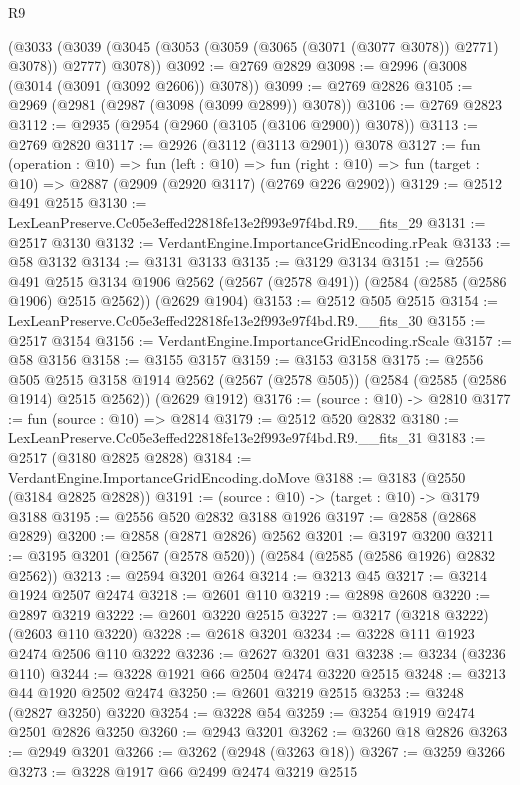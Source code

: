 \begin{lexlean}{R9}
\begin{coremodule}
    (@3033 (@3039 (@3045 (@3053 (@3059 (@3065 (@3071 (@3077 @3078)) @2771) @3078)) @2777) @3078))
@3092 := @2769 @2829
@3098 := @2996 (@3008 (@3014 (@3091 (@3092 @2606)) @3078))
@3099 := @2769 @2826
@3105 := @2969 (@2981 (@2987 (@3098 (@3099 @2899)) @3078))
@3106 := @2769 @2823
@3112 := @2935 (@2954 (@2960 (@3105 (@3106 @2900)) @3078))
@3113 := @2769 @2820
@3117 := @2926 (@3112 (@3113 @2901)) @3078
@3127 := fun (operation : @10) =>
  fun (left : @10) =>
  fun (right : @10) => fun (target : @10) => @2887 (@2909 (@2920 @3117) (@2769 @226 @2902))
@3129 := @2512 @491 @2515
@3130 := LexLeanPreserve.Cc05e3effed22818fe13e2f993e97f4bd.R9.__fits_29
@3131 := @2517 @3130
@3132 := VerdantEngine.ImportanceGridEncoding.rPeak
@3133 := @58 @3132
@3134 := @3131 @3133
@3135 := @3129 @3134
@3151 := @2556
    @491
    @2515
    @3134
    @1906
    @2562
    (@2567 (@2578 @491))
    (@2584 (@2585 (@2586 @1906) @2515 @2562))
    (@2629 @1904)
@3153 := @2512 @505 @2515
@3154 := LexLeanPreserve.Cc05e3effed22818fe13e2f993e97f4bd.R9.__fits_30
@3155 := @2517 @3154
@3156 := VerdantEngine.ImportanceGridEncoding.rScale
@3157 := @58 @3156
@3158 := @3155 @3157
@3159 := @3153 @3158
@3175 := @2556
    @505
    @2515
    @3158
    @1914
    @2562
    (@2567 (@2578 @505))
    (@2584 (@2585 (@2586 @1914) @2515 @2562))
    (@2629 @1912)
@3176 := (source : @10) -> @2810
@3177 := fun (source : @10) => @2814
@3179 := @2512 @520 @2832
@3180 := LexLeanPreserve.Cc05e3effed22818fe13e2f993e97f4bd.R9.__fits_31
@3183 := @2517 (@3180 @2825 @2828)
@3184 := VerdantEngine.ImportanceGridEncoding.doMove
@3188 := @3183 (@2550 (@3184 @2825 @2828))
@3191 := (source : @10) -> (target : @10) -> @3179 @3188
@3195 := @2556 @520 @2832 @3188 @1926
@3197 := @2858 (@2868 @2829)
@3200 := @2858 (@2871 @2826) @2562
@3201 := @3197 @3200
@3211 := @3195 @3201 (@2567 (@2578 @520)) (@2584 (@2585 (@2586 @1926) @2832 @2562))
@3213 := @2594 @3201 @264
@3214 := @3213 @45
@3217 := @3214 @1924 @2507 @2474
@3218 := @2601 @110
@3219 := @2898 @2608
@3220 := @2897 @3219
@3222 := @2601 @3220 @2515
@3227 := @3217 (@3218 @3222) (@2603 @110 @3220)
@3228 := @2618 @3201
@3234 := @3228 @111 @1923 @2474 @2506 @110 @3222
@3236 := @2627 @3201 @31
@3238 := @3234 (@3236 @110)
@3244 := @3228 @1921 @66 @2504 @2474 @3220 @2515
@3248 := @3213 @44 @1920 @2502 @2474
@3250 := @2601 @3219 @2515
@3253 := @3248 (@2827 @3250) @3220
@3254 := @3228 @54
@3259 := @3254 @1919 @2474 @2501 @2826 @3250
@3260 := @2943 @3201
@3262 := @3260 @18 @2826
@3263 := @2949 @3201
@3266 := @3262 (@2948 (@3263 @18))
@3267 := @3259 @3266
@3273 := @3228 @1917 @66 @2499 @2474 @3219 @2515

\end{coremodule}
\end{lexlean}

